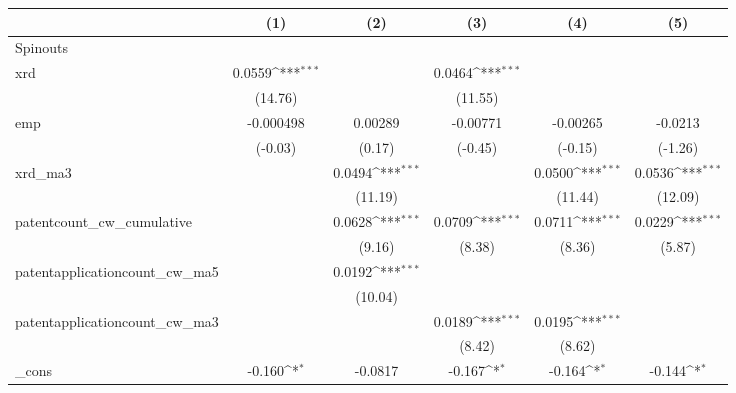 {
\def\sym#1{\ifmmode^{#1}\else\(^{#1}\)\fi}
\begin{tabular}{l*{5}{c}}
\hline\hline
            &\multicolumn{1}{c}{(1)}         &\multicolumn{1}{c}{(2)}         &\multicolumn{1}{c}{(3)}         &\multicolumn{1}{c}{(4)}         &\multicolumn{1}{c}{(5)}         \\
\hline
Spinouts    &                     &                     &                     &                     &                     \\
xrd         &      0.0559\sym{***}&                     &      0.0464\sym{***}&                     &                     \\
            &     (14.76)         &                     &     (11.55)         &                     &                     \\
[1em]
emp         &   -0.000498         &     0.00289         &    -0.00771         &    -0.00265         &     -0.0213         \\
            &     (-0.03)         &      (0.17)         &     (-0.45)         &     (-0.15)         &     (-1.26)         \\
[1em]
xrd\_ma3     &                     &      0.0494\sym{***}&                     &      0.0500\sym{***}&      0.0536\sym{***}\\
            &                     &     (11.19)         &                     &     (11.44)         &     (12.09)         \\
[1em]
patentcount\_cw\_cumulative&                     &      0.0628\sym{***}&      0.0709\sym{***}&      0.0711\sym{***}&      0.0229\sym{***}\\
            &                     &      (9.16)         &      (8.38)         &      (8.36)         &      (5.87)         \\
[1em]
patentapplicationcount\_cw\_ma5&                     &      0.0192\sym{***}&                     &                     &                     \\
            &                     &     (10.04)         &                     &                     &                     \\
[1em]
patentapplicationcount\_cw\_ma3&                     &                     &      0.0189\sym{***}&      0.0195\sym{***}&                     \\
            &                     &                     &      (8.42)         &      (8.62)         &                     \\
[1em]
\_cons      &      -0.160\sym{*}  &     -0.0817         &      -0.167\sym{*}  &      -0.164\sym{*}  &      -0.144\sym{*}  \\

\end{tabular}}
